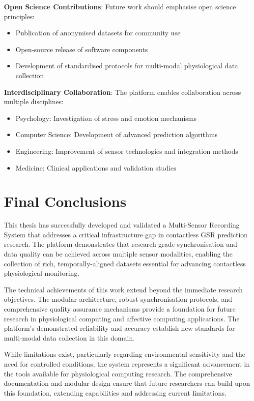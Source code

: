 \textbf{Open Science Contributions}: Future work should emphasise open science principles:

\begin{itemize}
\item Publication of anonymised datasets for community use
\item Open-source release of software components
\item Development of standardised protocols for multi-modal physiological data collection
\end{itemize}

\textbf{Interdisciplinary Collaboration}: The platform enables collaboration across multiple disciplines:

\begin{itemize}
\item Psychology: Investigation of stress and emotion mechanisms
\item Computer Science: Development of advanced prediction algorithms
\item Engineering: Improvement of sensor technologies and integration methods
\item Medicine: Clinical applications and validation studies
\end{itemize}

\section{Final Conclusions}

This thesis has successfully developed and validated a Multi-Sensor Recording System that addresses a critical infrastructure gap in contactless GSR prediction research. The platform demonstrates that research-grade synchronisation and data quality can be achieved across multiple sensor modalities, enabling the collection of rich, temporally-aligned datasets essential for advancing contactless physiological monitoring.

The technical achievements of this work extend beyond the immediate research objectives. The modular architecture, robust synchronisation protocols, and comprehensive quality assurance mechanisms provide a foundation for future research in physiological computing and affective computing applications. The platform's demonstrated reliability and accuracy establish new standards for multi-modal data collection in this domain.

While limitations exist, particularly regarding environmental sensitivity and the need for controlled conditions, the system represents a significant advancement in the tools available for physiological computing research. The comprehensive documentation and modular design ensure that future researchers can build upon this foundation, extending capabilities and addressing current limitations.

